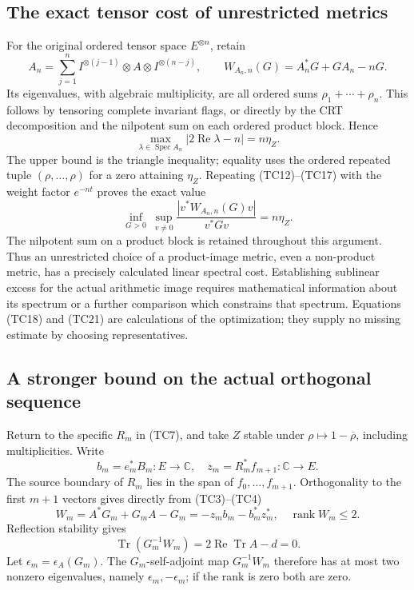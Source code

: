 \subsection{The exact tensor cost of unrestricted metrics}

For the original ordered tensor space \(E^{\otimes n}\), retain
\[
 A_n=\sum_{j=1}^n
        I^{\otimes(j-1)}\otimes A\otimes I^{\otimes(n-j)},\qquad
 W_{A_n,n}(G)=A_n^*G+GA_n-nG .
 \tag{TC19}
\]
Its eigenvalues, with algebraic multiplicity, are all ordered sums
\(\rho_1+\cdots+\rho_n\).  This follows by tensoring complete
invariant flags, or directly by the CRT decomposition and the
nilpotent sum on each ordered product block.  Hence
\[
 \max_{\lambda\in\operatorname{Spec}A_n}
       |2\operatorname{Re}\lambda-n|=n\eta_Z.
 \tag{TC20}
\]
The upper bound is the triangle inequality; equality uses the
ordered repeated tuple \((\rho,\ldots,\rho)\) for a zero attaining
\(\eta_Z\).  Repeating (TC12)--(TC17) with the weight factor
\(e^{-nt}\) proves the exact value
\[
 \boxed{\inf_{G>0}\ 
      \sup_{v\ne0}\frac{|v^*W_{A_n,n}(G)v|}{v^*Gv}
                  =n\eta_Z.}
 \tag{TC21}
\]
The nilpotent sum on a product block is retained throughout this
argument.  Thus an unrestricted choice of a product-image metric,
even a non-product metric, has a precisely calculated linear
spectral cost.  Establishing sublinear excess for the actual
arithmetic image requires mathematical information about its
spectrum or a further comparison which constrains that spectrum.
Equations (TC18) and (TC21) are calculations of the optimization;
they supply no missing estimate by choosing representatives.

\subsection{A stronger bound on the actual orthogonal sequence}

Return to the specific \(R_m\) in (TC7), and take \(Z\) stable under
\(\rho\mapsto1-\overline\rho\), including multiplicities.
Write
\[
 b_m=e_m^*B_m:E\to\mathbb C,\quad
 z_m=R_m^*f_{m+1}:\mathbb C\to E .
\]
The source boundary of \(R_m\) lies in the span of
\(f_0,\ldots,f_{m+1}\).  Orthogonality to the first \(m+1\)
vectors gives directly from (TC3)--(TC4)
\[
 W_m=A^*G_m+G_mA-G_m=-z_mb_m-b_m^*z_m^*,
 \quad \operatorname{rank}W_m\leq2 .
 \tag{TC22}
\]
Reflection stability gives
\[
 \operatorname{Tr}(G_m^{-1}W_m)
     =2\operatorname{Re}\operatorname{Tr}A-d=0.
 \tag{TC23}
\]
Let \(\epsilon_m=\epsilon_A(G_m)\).  The \(G_m\)-self-adjoint map
\(G_m^{-1}W_m\) therefore has at most two nonzero eigenvalues,
namely \(\epsilon_m,-\epsilon_m\); if the rank is zero both are zero.

